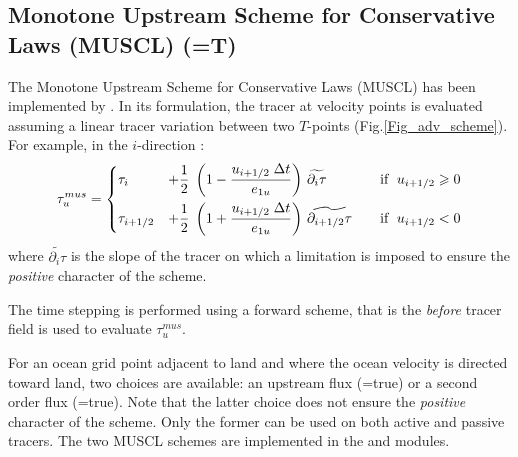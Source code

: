 \subsection[MUSCL scheme  (\np{ln\_traadv\_muscl})]
	{Monotone Upstream Scheme for Conservative Laws (MUSCL) (=T)}
\label{TRA_adv_muscl}

The Monotone Upstream Scheme for Conservative Laws (MUSCL) has been 
implemented by \citet{Levy_al_GRL01}. In its formulation, the tracer at velocity points 
is evaluated assuming a linear tracer variation between two $T$-points 
(Fig.\ref{Fig_adv_scheme}). For example, in the $i$-direction :
\begin{equation} \label{Eq_tra_adv_muscl}
   \tau _u^{mus} = \left\{      \begin{aligned}
         &\tau _i  &+ \frac{1}{2} \;\left( 1-\frac{u_{i+1/2} \;\Delta t}{e_{1u}} \right)
         &\ \widetilde{\partial _i \tau}  & \quad \text{if }\;u_{i+1/2} \geqslant 0      \\
         &\tau _{i+1/2} &+\frac{1}{2}\;\left( 1+\frac{u_{i+1/2} \;\Delta t}{e_{1u} } \right)
         &\ \widetilde{\partial_{i+1/2} \tau } & \text{if }\;u_{i+1/2} <0
   \end{aligned}    \right.
\end{equation}
where $\widetilde{\partial _i \tau}$ is the slope of the tracer on which a limitation 
is imposed to ensure the \textit{positive} character of the scheme.

The time stepping is performed using a forward scheme, that is the \textit{before} 
tracer field is used to evaluate $\tau _u^{mus}$.

For an ocean grid point adjacent to land and where the ocean velocity is 
directed toward land, two choices are available: an upstream flux 
(=true) or a second order flux 
(=true). Note that the latter choice does not ensure 
the \textit{positive} character of the scheme. Only the former can be used 
on both active and passive tracers. The two MUSCL schemes are implemented 
in the  and  modules.

